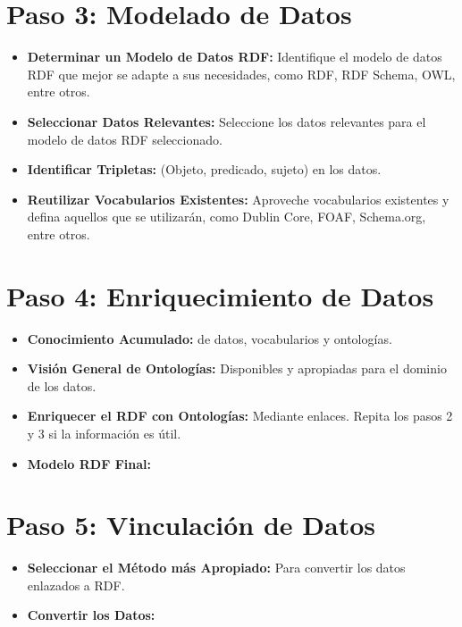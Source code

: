 \documentclass[11pt]{report}
\begin{document}
		\section{Paso 3: Modelado de Datos}
		\begin{itemize}
			\item \textbf{Determinar un Modelo de Datos RDF:} Identifique el modelo de datos RDF que mejor se adapte a sus necesidades, como RDF, RDF Schema, OWL, entre otros.
			
			\item \textbf{Seleccionar Datos Relevantes:} Seleccione los datos relevantes para el modelo de datos RDF seleccionado.
			
			\item \textbf{Identificar Tripletas:} (Objeto, predicado, sujeto) en los datos.
			
			\item \textbf{Reutilizar Vocabularios Existentes:} Aproveche vocabularios existentes y defina aquellos que se utilizarán, como Dublin Core, FOAF, Schema.org, entre otros.
		\end{itemize}
		
		\section{Paso 4: Enriquecimiento de Datos}
		\begin{itemize}
			\item \textbf{Conocimiento Acumulado:} de datos, vocabularios y ontologías.
			
			\item \textbf{Visión General de Ontologías:} Disponibles y apropiadas para el dominio de los datos.
			
			\item \textbf{Enriquecer el RDF con Ontologías:} Mediante enlaces. Repita los pasos 2 y 3 si la información es útil.
			
			\item \textbf{Modelo RDF Final:}
		\end{itemize}
		\section{Paso 5: Vinculación de Datos}
		\begin{itemize}
			\item \textbf{Seleccionar el Método más Apropiado:} Para convertir los datos enlazados a RDF.
			
			\item \textbf{Convertir los Datos:}
		\end{itemize}
\end{document}
